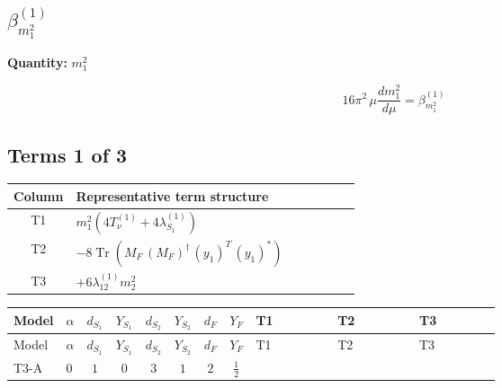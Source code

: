 \documentclass[8pt]{article}
\begin{document}
\begin{landscape}
\section*{$\beta_{m_1^2}^{(1)}$}
\noindent\textbf{Quantity: }$m_1^2$\par\smallskip
\[16\pi^2\,\mu\frac{d m_1^2}{d\mu}=\beta_{m_1^2}^{(1)}\]
\subsection*{Terms 1 of 3}
\begin{center}
\begin{tabular}{@{}c >{\raggedright\arraybackslash}p{0.82\linewidth}@{}}
\toprule
Column & Representative term structure \\
\midrule
T1 & \(\displaystyle {m_1^2} (4 T_{\nu}^{(1)}+4 {\lambda_{S_1}^{(1)}})\) \\
\midrule
T2 & \(\displaystyle -8 \operatorname{Tr}\!\left({M_F}\,\left({M_F}\right)^{\dagger}\,\left({y_1}\right)^{T}\,\left({y_1}\right)^{*}\right)\) \\
\midrule
T3 & \(\displaystyle +6 {\lambda_{12}^{(1)}} {m_2^2}\) \\
\midrule
\bottomrule
\end{tabular}
\end{center}
\smallskip
\tiny
\begin{longtable}{@{}llcccccc >{\raggedright\arraybackslash}p{0.21\linewidth} >{\raggedright\arraybackslash}p{0.21\linewidth} >{\raggedright\arraybackslash}p{0.21\linewidth}@{}}
\toprule
Model & $\alpha$ & $d_{S_1}$ & $Y_{S_1}$ & $d_{S_2}$ & $Y_{S_2}$ & $d_F$ & $Y_F$ & T1 & T2 & T3 \\
\midrule
\endfirsthead
\toprule
Model & $\alpha$ & $d_{S_1}$ & $Y_{S_1}$ & $d_{S_2}$ & $Y_{S_2}$ & $d_F$ & $Y_F$ & T1 & T2 & T3 \\
\midrule
\endhead
T3-A & $0$ & $1$ & $0$ & $3$ & $1$ & $2$ & $\frac{1}{2}$ & \scriptsize\adjustbox{max width=\linewidth}{$\begin{gathered} {m_1^2} (4 T_{\nu}^{(1)}+4 {\lambda_{S_1}^{(1)}})\end{gathered}$} & \scriptsize\adjustbox{max width=\linewidth}{$\begin{gathered} -8 \operatorname{Tr}\!\left({M_F}\,\left({M_F}\right)^{\dagger}\,\left({y_1}\right)^{T}\,\left({y_1}\right)^{*}\right)\end{gathered}$} & \scriptsize\adjustbox{max width=\linewidth}{$\begin{gathered} +6 {\lambda_{12}^{(1)}} {m_2^2}\end{gathered}$} \\

\end{longtable}
\end{landscape}
\end{document}
